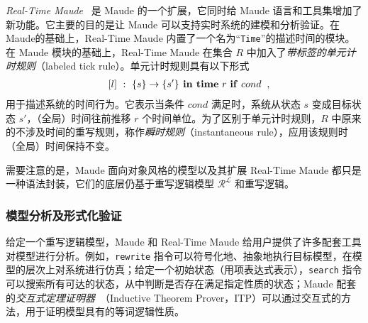 \emph{Real-Time Maude}~\cite{DBLP:journals/lisp/OlveczkyM07} 是 Maude 的一个扩展，它同时给 Maude 语言和工具集增加了新功能。它主要的目的是让 Maude 可以支持实时系统的建模和分析验证。在Maude的基础上，Real-Time Maude 内置了一个名为“\verb|Time|”的描述时间的模块。在 Maude 模块的基础上，Real-Time Maude 在集合 $\mathit{R}$ 中加入了\emph{带标签的单元计时规则}（labeled tick rule）。单元计时规则具有以下形式
\begin{eqnarray}
& & [l]~:~\{s\}\rightarrow\{s'\} \mbox{\textbf{ in time}
  }r\mbox{ \textbf{if} }cond \;\; , \nonumber
\end{eqnarray} 
用于描述系统的时间行为。它表示当条件 $cond$ 满足时，系统从状态 $s$ 变成目标状态 $s'$，（全局）时间往前推移 $r$ 个时间单位。为了区别于单元计时规则，$\mathit{R}$ 中原来的不涉及时间的重写规则，称作\emph{瞬时规则}（instantaneous rule），应用该规则时（全局）时间保持不变。

需要注意的是，Maude 面向对象风格的模型以及其扩展 Real-Time Maude 都只是一种语法封装，它们的底层仍基于重写逻辑模型 $\mathcal{R^L}$ 和重写逻辑。 

\subsubsection{模型分析及形式化验证}
给定一个重写逻辑模型，Maude 和 Real-Time Maude 给用户提供了许多配套工具对模型进行分析。例如，\verb|rewrite| 指令可以符号化地、抽象地执行目标模型，在模型的层次上对系统进行仿真；给定一个初始状态（用项表达式表示），\verb|search| 指令可以搜索所有可达的状态，从中判断是否存在满足指定性质的状态；Maude 配套的\emph{交互式定理证明器}~\cite{DBLP:journals/jucs/ClavelPR06}（Inductive Theorem Prover，ITP）可以通过交互式的方法，用于证明模型具有的等词逻辑性质。

